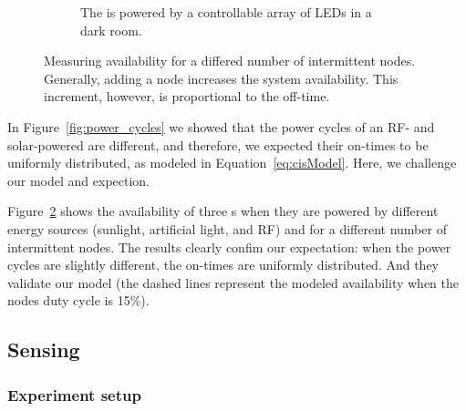\begin{figure}[t]
\begin{subfigure}{.66\columnwidth}
                \caption{The \sys is powered by a controllable array of LEDs in a dark room. \vspace{1em}}
            \label{fig:rfPwrCIS}
        \end{subfigure}
        \caption{Measuring \fullsys availability for a differed number of intermittent nodes. Generally, adding a node increases the system availability. This increment, however, is proportional to the \sys off-time.}
        \label{fig:pwrCIS}
\end{figure} 
%
In Figure~\ref{fig:power_cycles} we showed that the power cycles of an RF- and solar-powered \sys are different, and therefore, we expected their on-times to be uniformly distributed, as modeled in Equation~\ref{eq:cisModel}. Here, we challenge our model and expection. 

Figure~\ref{fig:pwrCIS} shows the availability of three \sys{}s when they are powered by different energy sources (sunlight, artificial light, and RF) and for a different number of intermittent nodes.
The results clearly confim our expectation: when the power cycles are slightly different, the on-times are uniformly distributed. And they validate our model (the dashed lines represent the modeled availability when the nodes duty cycle is 15\%).

%

\subsection{Sensing}
\subsubsection{Experiment setup}
\label{sec:experiment_setup}

